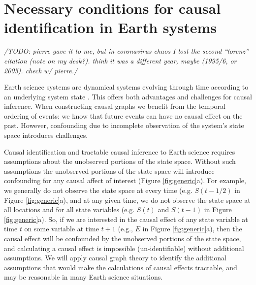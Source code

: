 \documentclass[12pt]{article}
\begin{document}
\section{Necessary conditions for causal identification in Earth
  systems}
\label{sec:necess-cond-caus}

\textit{/TODO: pierre gave it to me, but in coronavirus chaos I lost
  the second ``lorenz'' citation (note on my desk?). think it was a
  different year, maybe (1995/6, or 2005). check w/ pierre./}

Earth science systems are dynamical systems evolving through time
according to an underlying system state
\citep{lorenz-1963,lorenz1996predictability,majda-state}. This offers
both advantages and challenges for causal inference. When constructing
causal graphs we benefit from the temporal ordering of events: we know
that future events can have no causal effect on the past. However,
confounding due to incomplete observation of the system's state space
introduces challenges.


Causal identification and tractable causal inference to Earth science
requires assumptions about the unobserved portions of the state
space. Without such assumptions the unobserved portions of the state
space will introduce confounding for any causal affect of interest
(Figure \ref{fig:generic}a). For example, we generally do not observe
the state space at every time (e.g. $S(t-1/2)$ in Figure
\ref{fig:generic}a), and at any given time, we do not observe the
state space at all locations and for all state variables (e.g. $S(t)$
and $S(t-1)$ in Figure \ref{fig:generic}a). So, if we are interested
in the causal effect of any state variable at time $t$ on some
variable at time $t+1$ (e.g., $E$ in Figure \ref{fig:generic}a), then
the causal effect will be confounded by the unobserved portions of the
state space, and calculating a causal effect is impossible
(un-identifiable) without additional assumptions. We will apply causal
graph theory to identify the additional assumptions that would make
the calculations of causal effects tractable, and may be reasonable in
many Earth science situations.
\end{document}

